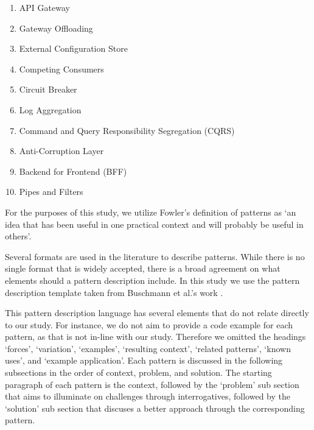 \documentclass{bmcart}
\begin{document}
\begin{enumerate}
  \item API Gateway 
  \item Gateway Offloading 
  \item External Configuration Store
  \item Competing Consumers
  \item Circuit Breaker
  \item Log Aggregation
  \item Command and Query Responsibility Segregation (CQRS)
  \item Anti-Corruption Layer
  \item Backend for Frontend (BFF)
  \item Pipes and Filters
\end{enumerate}
  
\hspace{1cm}

For the purposes of this study, we utilize Fowler's definition \cite{fowler1997analysis} of patterns as  `an idea that has been useful in one practical context and will probably be useful in others'.


Several formats are used in the literature to describe patterns. While there is no single format that is widely accepted, there is a broad agreement on what elements should a pattern description include. In this study we use the pattern description template taken from Buschmann et al.'s work \cite{buschmann2008pattern}. 

This pattern description language has several elements that do not relate directly to our study. For instance, we do not aim to provide a code example for each pattern, as that is not in-line with our study. Therefore we omitted the headings `forces', `variation', `examples', `resulting context', `related patterns', `known uses', and `example application'. Each pattern is discussed in the following subsections in the order of context, problem, and solution. The starting paragraph of each pattern is the context, followed by the `problem' sub section that aims to illuminate on challenges through interrogatives, followed by the `solution' sub section that discuses a better approach through the corresponding pattern.
\end{document}
